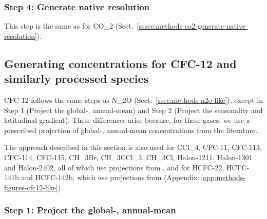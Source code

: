 \subsubsection{Step 4: Generate native resolution}
\label{sssec:methods-n2o-like-generate-native-resolution}

This step is the same as for CO_2 (Sect.~\ref{sssec:methods-co2-generate-native-resolution}).

\subsection{Generating concentrations for CFC-12 and similarly processed species}
\label{ssec:methods-cfc12-like}

CFC-12 follows the same steps as N_2O (Sect.~\ref{ssec:methods-n2o-like}),
except in Step 1 (Project the global-, annual-mean) and Step 2 (Project the seasonality and latitudinal gradient).
These differences arise because, for these gases,
we use a prescribed projection of global-, annual-mean concentrations from the literature.

The approach described in this section is also used for
CCl_4, CFC-11, CFC-113, CFC-114, CFC-115, CH_3Br, CH_3CCl_3, CH_3Cl, Halon-1211, Halon-1301 and Halon-2402,
all of which use projections from \citet{wmo_ozone-ch7_2022},
and for HCFC-22, HCFC-141b and HCFC-142b,
which use projections from \citet{western_hcfcs_2024}
(Appendix~\ref{app:methods-figures-cfc12-like}).

\subsubsection{Step 1: Project the global-, annual-mean}
\label{sssec:methods-cfc12-like-project-global-mean}

